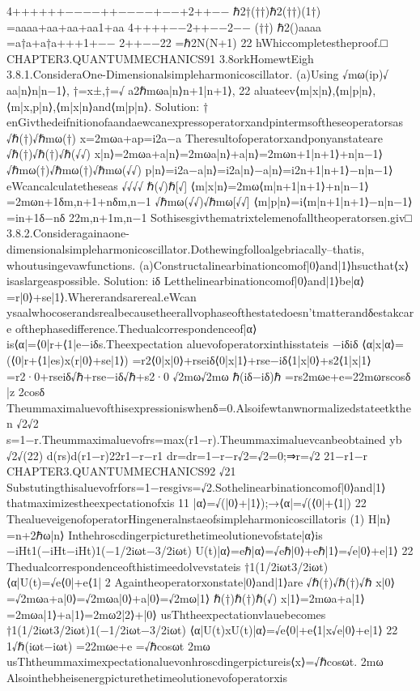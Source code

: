 {{4++++++−−−−++−−−−+−−+2++−−
ℏ2†(††)ℏ2(††)(1†)
=aaaa+aa+aa+aa1+aa
4++++−−2++−−2−−
(††)
ℏ2()aaaa
=a†a+a†a+++1+−−
2++−−22
=ℏ2N(N+1)
22
hWhiccompletestheproof.□
CHAPTER3.QUANTUMMECHANICS91
3.8orkHomewtEigh
3.8.1.ConsideraOne-Dimensionalsimpleharmonicoscillator.
(a)Using
}√mω(ip)}{√
aa|n⟩n|n−1⟩,
†=x±,†=√
a2ℏmωa|n⟩n+1|n+1⟩,
22
aluateev⟨m|x|n⟩,⟨m|p|n⟩,⟨m|{x,p}|n⟩,⟨m|x|n⟩and⟨m|p|n⟩.
Solution:
†
enGivthedeifnitionofaandaewcanexpressoperatorxandpintermsoftheseoperatorsas
√ℏ(†)√ℏmω(†)
x=2mωa+ap=i2a−a
Theresultofoperatorxandponyanstateare
√ℏ(†)√ℏ(†)√ℏ(√√)
x|n⟩=2mωa+a|n⟩=2mωa|n⟩+a|n⟩=2mωn+1|n+1⟩+n|n−1⟩
√ℏmω(†)√ℏmω(†)√ℏmω(√√)
p|n⟩=i2a−a|n⟩=i2a|n⟩−a|n⟩=i2n+1|n+1⟩−n|n−1⟩
eWcancalculatetheseas
√√√√
ℏ(√)ℏ[√]
⟨m|x|n⟩=2mω⟨m|n+1|n+1⟩+n|n−1⟩=2mωn+1δm,n+1+nδm,n−1
√ℏmω(√√)√ℏmω[√√]
⟨m|p|n⟩=i⟨m|n+1|n+1⟩−n|n−1⟩=in+1δ−nδ
22m,n+1m,n−1
Sothisesgivthematrixtelemenofalltheoperatorsen.giv□
3.8.2.Consideragainaone-dimensionalsimpleharmonicoscillator.Dothewingfolloalgebriacally–thatis,
whoutusingevawfunctions.
(a)Constructalinearbinationcomof|0⟩and|1⟩hsucthat⟨x⟩isaslargeaspossible.
Solution:
iδ
Letthelinearbinationcomof|0⟩and|1⟩be|α⟩=r|0⟩+se|1⟩.Whererandsarereal.eWcan
ysaalwhocoserandsrealbecausetheerallvophaseofthestatedoesn’tmatterandδestakcare
ofthephasedifference.Thedualcorrespondenceof|α⟩is⟨α|=⟨0|r+⟨1|e−iδs.Theexpectation
aluevofoperatorxinthisstateis
−iδiδ
⟨α|x|α⟩=(⟨0|r+⟨1|es)x(r|0⟩+se|1⟩)
=r2⟨0|x|0⟩+rseiδ⟨0|x|1⟩+rse−iδ⟨1|x|0⟩+s2⟨1|x|1⟩
=r2·0+rseiδ√ℏ+rse−iδ√ℏ+s2·0
√2mω√2mω
ℏ(iδ−iδ)ℏ
=rs2mωe+e=22mωrscosδ
|{z}
2cosδ
Theummaximaluevofthisexpressioniswhenδ=0.Alsoifewtanwnormalizedstateetkthen
√2√2
s=1−r.Theummaximaluevofrs=max(r1−r).Theummaximaluevcanbeobtained
yb
√2√(22)
d(rs)d(r1−r)22r1−r−r1
dr=dr=1−r−r√2=√2=0;⇒r=√2
21−r1−r
CHAPTER3.QUANTUMMECHANICS92
√21
Substutingthisaluevofrfors=1−resgivs=√2.Sothelinearbinationcomof|0⟩and|1⟩
thatmaximizestheexpectationofxis
11
|α⟩=√(|0⟩+|1⟩);→⟨α|=√(⟨0|+⟨1|)
22
ThealueveigenofoperatorHingeneralnstaeofsimpleharmonicoscillatoris
(1)
H|n⟩=n+2ℏω|n⟩
Inthehroscdingerpicturethetimeolutionevofstate|α⟩is
−iHt1(−iHt−iHt)1(−1/2iωt−3/2iωt)
U(t)|α⟩=eℏ|α⟩=√eℏ|0⟩+eℏ|1⟩=√e|0⟩+e|1⟩
22
Thedualcorrespondenceofthistimeedolvevstateis
†1(1/2iωt3/2iωt)
⟨α|U(t)=√e⟨0|+e⟨1|
2
Againtheoperatorxonstate|0⟩and|1⟩are
√ℏ(†)√ℏ(†)√ℏ
x|0⟩=√2mωa+a|0⟩=√2mωa|0⟩+a|0⟩=√2mω|1⟩
ℏ(†)ℏ(†)ℏ(√)
x|1⟩=2mωa+a|1⟩=2mωa|1⟩+a|1⟩=2mω2|2⟩+|0⟩
usThtheexpectationvlauebecomes
†1(1/2iωt3/2iωt)1(−1/2iωt−3/2iωt)
⟨α|U(t)xU(t)|α⟩=√e⟨0|+e⟨1|x√e|0⟩+e|1⟩
22
1√ℏ(iωt−iωt)
=22mωe+e
=√ℏcosωt
2mω
usThtheummaximexpectationaluevonhroscdingerpictureis⟨x⟩=√ℏcosωt.
2mω
Alsointhebheisenergpicturethetimeolutionevofoperatorxis
}
